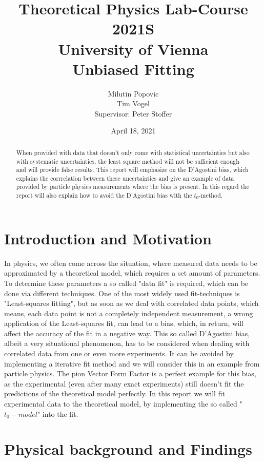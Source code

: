 \documentclass[a4paper]{article}
\title{Theoretical Physics Lab-Course 2021S\\ University of Vienna \vspace{1.25cm}\\ Unbiased Fitting}
\author{Milutin Popovic \\ Tim Vogel \vspace{1cm}\\ Supervisor: Peter Stoffer}
\date{April 18, 2021}
\begin{document}
\maketitle
\begin{abstract}
        When provided with data that doesn't only come with statistical
        uncertainties but also with systematic uncertainties, the least square
        method will not be sufficient enough and will provide false results.
        This report will emphasize on the D'Agostini bias, which explains the
        corrrelation between these uncertainties and give an example of data
        provided by particle physics measurements where the bias is present. In
        this regard the report will also explain how to avoid the D'Agostini
        bias with the $t_0$-method.
\end{abstract}

\thispagestyle{empty}
\tableofcontents

\newpage
\section{Introduction and Motivation}
In physics, we often come across the situation, where measured data needs to be
approximated by a theoretical model, which requires a set amount of parameters.
To determine these parameters a so called "data fit" is required, which can be
done via different techniques. One of the most widely used fit-techniques is
"Least-squares fitting", but as soon as we deal with correlated  data points,
which means, each data point is not a completely independent measurement, a
wrong application of the Least-squares fit, can lead to a bias, which, in
return, will affect the accuracy of the fit in a negative way. This so called
D'Agostini bias, albeit a very situational phenomenon, has to be considered
when dealing with correlated data from one or even more experiments. It can be
avoided by implementing a iterative fit method and we will consider this in an
example from particle physics. The pion Vector Form Factor is a perfect example
for this bias, as the experimental (even after many exact experiments) still
doesn't fit the predictions of  the theoretical model perfectly. In this report
we will fit experimental data to the theoretical model, by implementing the so
called "$t_0-model$" into the fit.
\section{Physical background and Findings} %
\end{document}
